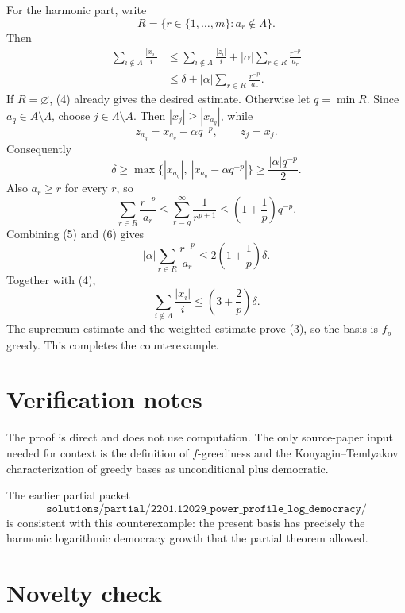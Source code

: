 \documentclass[11pt]{article}
\theoremstyle{definition}
\begin{document}
For the harmonic part, write
\[
        R=\{r\in\{1,\ldots,m\}: a_r\notin\Lambda\}.
\]
Then
\begin{equation}
\begin{aligned}
        \sum_{i\notin\Lambda}\frac{|x_i|}{i}
        &\le
        \sum_{i\notin\Lambda}\frac{|z_i|}{i}
        +|\alpha|\sum_{r\in R}\frac{r^{-p}}{a_r}  \\
        &\le \delta+
        |\alpha|\sum_{r\in R}\frac{r^{-p}}{a_r}.
\end{aligned}
\tag{4}
\end{equation}
If \(R=\varnothing\), (4) already gives the desired estimate.  Otherwise let
\(q=\min R\).  Since \(a_q\in A\setminus\Lambda\), choose
\(j\in\Lambda\setminus A\).  Then \(|x_j|\ge |x_{a_q}|\), while
\[
        z_{a_q}=x_{a_q}-\alpha q^{-p},
        \qquad z_j=x_j.
\]
Consequently
\[
        \delta\ge
        \max\{|x_{a_q}|,\ |x_{a_q}-\alpha q^{-p}|\}
        \ge \frac{|\alpha|q^{-p}}{2}.
        \tag{5}
\]
Also \(a_r\ge r\) for every \(r\), so
\[
        \sum_{r\in R}\frac{r^{-p}}{a_r}
        \le
        \sum_{r=q}^\infty \frac{1}{r^{p+1}}
        \le \left(1+\frac{1}{p}\right)q^{-p}.
        \tag{6}
\]
Combining (5) and (6) gives
\[
        |\alpha|\sum_{r\in R}\frac{r^{-p}}{a_r}
        \le 2\left(1+\frac{1}{p}\right)\delta.
\]
Together with (4),
\[
        \sum_{i\notin\Lambda}\frac{|x_i|}{i}
        \le \left(3+\frac{2}{p}\right)\delta.
\]
The supremum estimate and the weighted estimate prove (3), so the basis is
\(f_p\)-greedy.  This completes the counterexample.

\section*{Verification notes}

The proof is direct and does not use computation.  The only source-paper input
needed for context is the definition of \(f\)-greediness and the
Konyagin--Temlyakov characterization of greedy bases as unconditional plus
democratic.

The earlier partial packet
\[
\texttt{solutions/partial/2201.12029\_power\_profile\_log\_democracy/}
\]
is consistent with this counterexample: the present basis has precisely the
harmonic logarithmic democracy growth that the partial theorem allowed.

\section*{Novelty check}
\end{document}
